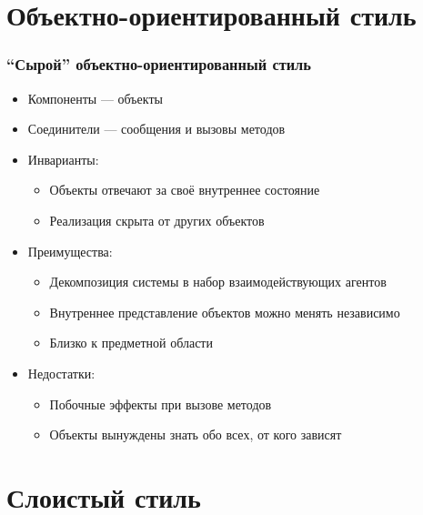 \documentclass{../../slides-style}
\begin{document}
    \section{Объектно-ориентированный стиль}

    \begin{frame}
        \frametitle{``Сырой'' объектно-ориентированный стиль}
        \begin{itemize}
            \item Компоненты --- объекты
            \item Соединители --- сообщения и вызовы методов
            \item Инварианты:
            \begin{itemize}
                \item Объекты отвечают за своё внутреннее состояние
                \item Реализация скрыта от других объектов
            \end{itemize}
            \item Преимущества:
            \begin{itemize}
                \item Декомпозиция системы в набор взаимодействующих агентов
                \item Внутреннее представление объектов можно менять независимо
                \item Близко к предметной области
            \end{itemize}
            \item Недостатки:
            \begin{itemize}
                \item Побочные эффекты при вызове методов
                \item Объекты вынуждены знать обо всех, от кого зависят
            \end{itemize}
        \end{itemize}
    \end{frame}

    \section{Слоистый стиль}
\end{document}
